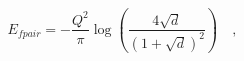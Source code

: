 \begin{equation}
E_{fpair} = - \frac{Q^2}{\pi} \log\left(\frac{4\sqrt{d}}{\left(1+\sqrt{d}\right)^2}\right)\quad,
\label{EneedleAsymm}
\end{equation}

